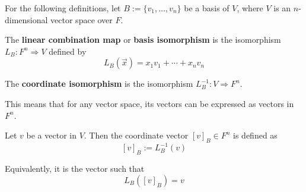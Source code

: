 For the following definitions, let $B := \{ v_1, \ldots, v_n \}$ be a basis of $V$, where $V$ is an $n$-dimensional vector space over $F$.

\begin{definition}
  The \textbf{linear combination map} or \textbf{basis isomorphism} is the isomorphism $L_B : F^n \Rightarrow V$ defined by
  \[
    L_B(\vec{x}) = x_1 v_1 + \cdots + x_n v_n
  \]
\end{definition}

\begin{definition}
  The \textbf{coordinate isomorphism} is the isomorphism $L_B^{-1} : V \Rightarrow 
  F^n$.

  This means that for any vector space, its vectors can be expressed as vectors in $F^n$.
\end{definition}

\begin{definition}
  Let $v$ be a vector in $V$. Then the coordinate vector $[v]_B \in F^n$ is defined as 
  \[
    [v]_B := L_B^{-1}(v)
  \]

  Equivalently, it is the vector such that
  \[
    L_B([v]_B) = v
  \]
\end{definition}


